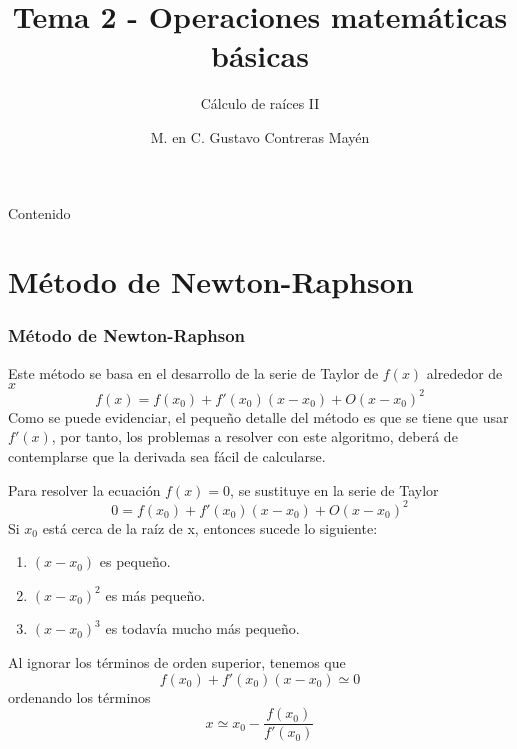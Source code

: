 


\title{Tema 2 - Operaciones matem\'{a}ticas b\'{a}sicas}
\subtitle{C\'{a}lculo de ra\'{i}ces II}
\author{M. en C. Gustavo Contreras May\'{e}n}
\maketitle
\fontsize{14}{14}\selectfont
{}
\begin{frame}{Contenido}
\tableofcontents[pausesections]
\end{frame}
\section{M\'{e}todo de Newton-Raphson}
\begin{frame}
\frametitle{M\'{e}todo de Newton-Raphson}
Este m\'{e}todo se basa en el desarrollo de la serie de Taylor de $f(x)$ alrededor de $x$
\[ f(x) = f(x_{0}) + f'(x_{0}) (x-x_{0}) + O(x-x_{0})^{2} \]
Como se puede evidenciar, el pequeño detalle del m\'{e}todo es que se tiene que usar $f'(x)$, por tanto, los problemas a resolver con este algoritmo, deber\'{a} de contemplarse que la derivada sea f\'{a}cil de calcularse.
\end{frame}
\begin{frame}
Para resolver la ecuaci\'{o}n $f(x)=0$, se sustituye en la serie de Taylor
\[ 0 = f(x_{0}) + f'(x_{0}) (x-x_{0}) + O(x-x_{0})^{2} \]
Si $x_{0}$ est\'{a} cerca de la ra\'{i}z de x, entonces sucede lo siguiente:
\begin{enumerate}[<+->]
\item $(x-x_{0})$ es pequeño.
\item $(x-x_{0})^{2}$ es m\'{a}s pequeño.
\item $(x-x_{0})^{3}$ es todav\'{i}a mucho m\'{a}s pequeño.
\end{enumerate}
\end{frame}
\begin{frame}
Al ignorar los t\'{e}rminos de orden superior, tenemos que
\[ f(x_{0}) + f'(x_{0})(x-x_{0}) \simeq 0\]
ordenando los t\'{e}rminos
\[ x \simeq x_{0} - \dfrac{f(x_{0})}{f'(x_{0})} \]
\end{frame}
